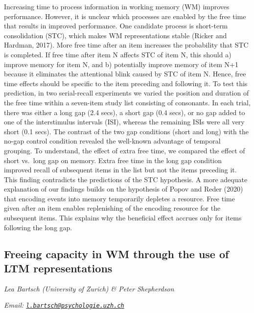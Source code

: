 \documentclass[
  12pt,
]{book}
\begin{document}
Increasing time to process information in working memory (WM) improves performance. However, it is unclear which processes are enabled by the free time that results in improved performance. One candidate process is short-term consolidation (STC), which makes WM representations stable (Ricker and Hardman, 2017). More free time after an item increases the probability that STC is completed. If free time after item N affects STC of item N, this should a) improve memory for item N, and b) potentially improve memory of item N+1 because it eliminates the attentional blink caused by STC of item N. Hence, free time effects should be specific to the item preceding and following it. To test this prediction, in two serial-recall experiments we varied the position and duration of the free time within a seven-item study list consisting of consonants. In each trial, there was either a long gap (2.4 secs), a short gap (0.4 secs), or no gap added to one of the interstimulus intervals (ISI), whereas the remaining ISIs were all very short (0.1 secs). The contrast of the two gap conditions (short and long) with the no-gap control condition revealed the well-known advantage of temporal grouping. To understand, the effect of extra free time, we compared the effect of short vs.~long gap on memory. Extra free time in the long gap condition improved recall of subsequent items in the list but not the items preceding it. This finding contradicts the predictions of the STC hypothesis. A more adequate explanation of our findings builds on the hypothesis of Popov and Reder (2020) that encoding events into memory temporarily depletes a resource. Free time given after an item enables replenishing of the encoding resource for the subsequent items. This explains why the beneficial effect accrues only for items following the long gap.

\hypertarget{freeing-capacity-in-wm-through-the-use-of-ltm-representations}{%
\subsection{Freeing capacity in WM through the use of LTM representations}\label{freeing-capacity-in-wm-through-the-use-of-ltm-representations}}

\emph{Lea Bartsch (University of Zurich) \& Peter Shepherdson}

\emph{Email: \href{mailto:l.bartsch@psychologie.uzh.ch}{\nolinkurl{l.bartsch@psychologie.uzh.ch}}}
\end{document}
